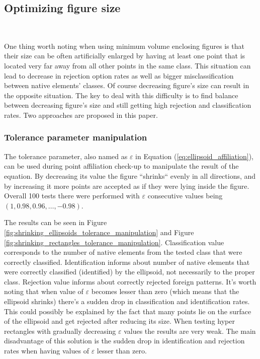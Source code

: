 \subsection{Optimizing figure size} \ \label{size_optimizing}

One thing worth noting when using minimum volume enclosing figures is that their size can be often artificially enlarged by having at least one point that is located very far away from all other points in the same class. This situation can lead to decrease in rejection option rates as well as bigger misclassification between native elements' classes. Of course decreasing figure's size can result in the opposite situation. The key to deal with this difficulty is to find balance between decreasing figure's size and still getting high rejection and classification rates. Two approaches are proposed in this paper.

\subsubsection{Tolerance parameter manipulation}

The tolerance parameter, also named as $\varepsilon$ in Equation (\ref{eq:ellipsoid_affiliation}), can be used during point affiliation check-up to manipulate the result of the equation. By decreasing its value the figure ``shrinks`` evenly in all directions, and by increasing it more points are accepted as if they were lying inside the figure. Overall 100 tests there were performed with $\varepsilon$ consecutive values being~$(1, 0.98, 0.96, \dots, -0.98)$. 

The results can be seen in Figure \ref{fig:shrinking_ellipsoids_tolerance_manipulation} and Figure \ref{fig:shrinking_rectangles_tolerance_manipulation}. Classification value corresponds to the number of native elements from the tested class that were correctly classified. Identification informs about number of native elements that were correctly classified (identified) by the ellipsoid, not necessarily to the proper class. Rejection value informs about correctly rejected foreign patterns. It's worth noting that when value of $\varepsilon$ becomes lesser than zero (which means that the ellipsoid shrinks) there's a sudden drop in classification and identification rates. This could possibly be explained by the fact that many points lie on the surface of the ellipsoid and get rejected after reducing its size. When testing hyper rectangles with gradually decreasing $\varepsilon$ values the results are very weak. The main disadvantage of this solution is the sudden drop in identification and rejection rates when having values of $\varepsilon$ lesser than zero.

